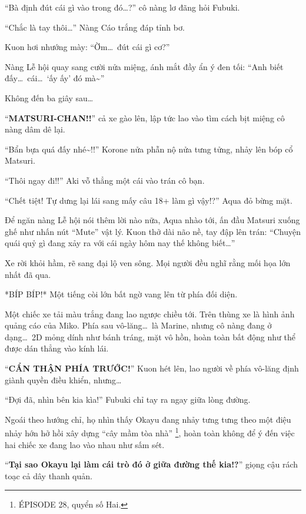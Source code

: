 \documentclass[../main.tex]{subfiles}
\begin{document}
``Bà định đút cái gì vào trong đó\dots?'' cô nàng lơ đãng hỏi Fubuki.

``Chắc là tay thôi\dots'' Nàng Cáo trắng đáp tỉnh bơ.

Kuon hơi nhướng mày: ``Ờm\dots\ đút cái gì cơ?''

Nàng Lễ hội quay sang cười nửa miệng, ánh mắt đầy ẩn ý đen tối: ``Anh biết đấy\dots\ cái\dots\ `ấy ấy' đó mà\~{}''

Không đến ba giây sau\dots

``\textbf{MATSURI-CHAN!!}'' cả xe gào lên, lập tức lao vào tìm cách bịt miệng cô nàng dâm dê lại.


``Bẩn bựa quá đấy nhé\~{}!!'' Korone nửa phẫn nộ nửa tưng tửng, nhảy lên bóp cổ Matsuri.

``Thôi ngay đi!!'' Aki vỗ thẳng một cái vào trán cô bạn.

``Chết tiệt! Tự dưng lại lái sang mấy câu 18+ làm gì vậy!?'' Aqua đỏ bừng mặt.

Để ngăn nàng Lễ hội nói thêm lời nào nữa, Aqua nhào tới, ấn đầu Matsuri xuống ghế như nhấn nút ``Mute'' vật lý. Kuon thở dài não nề, tay đập lên trán: ``Chuyện quái quỷ gì đang xảy ra với cái ngày hôm nay thế không biết\dots''

Xe rời khỏi hầm, rẽ sang đại lộ ven sông. Mọi người đều nghĩ rằng mối họa lớn nhất đã qua.

*BÍP BÍP!* Một tiếng còi lớn bất ngờ vang lên từ phía đối diện.

Một chiếc xe tải màu trắng đang lao ngược chiều tới. Trên thùng xe là hình ảnh quảng cáo của Miko. Phía sau vô-lăng\dots\ là Marine, nhưng cô nàng đang ở dạng\dots\ 2D mỏng dính như bánh tráng, mặt vô hồn, hoàn toàn bất động như thể được dán thẳng vào kính lái.

``\textbf{CẨN THẬN PHÍA TRƯỚC!}'' Kuon hét lên, lao người về phía vô-lăng định giành quyền điều khiển, nhưng\dots

``Đợi đã, nhìn bên kia kìa!'' Fubuki chỉ tay ra ngay giữa lòng đường.

Ngoái theo hướng chỉ, họ nhìn thấy Okayu đang nhảy tưng tưng theo một điệu nhảy hớn hở hồi xây dựng ``cây mầm tòa nhà'' \footnote{{\flaregothic ÉPISODE 28}, quyển số Hai.}, hoàn toàn không để ý đến việc hai chiếc xe đang lao vào nhau như sấm sét.


``\textbf{Tại sao Okayu lại làm cái trò đó ở giữa đường thế kia!?}'' giọng cậu rách toạc cả dây thanh quản.
\end{document}
